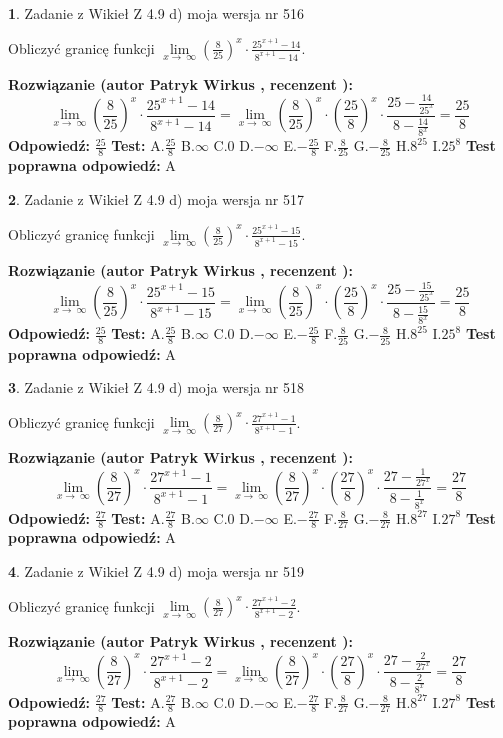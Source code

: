\documentclass[12pt, a4paper]{article}
\theoremstyle{definition} %
\newtheorem{zad}{}
\newcommand{\zadStart}[1]{\begin{zad}#1\newline}
\newcommand{\zadStop}{\end{zad}}
\newcommand{\rozwStart}[2]{\noindent \textbf{Rozwiązanie (autor #1 , recenzent #2): }\newline}
\newcommand{\rozwStop}{\newline}
\newcommand{\odpStart}{\noindent \textbf{Odpowiedź:}\newline}
\newcommand{\odpStop}{\newline}
\newcommand{\testStart}{\noindent \textbf{Test:}\newline}
\newcommand{\testStop}{\newline}
\newcommand{\kluczStart}{\noindent \textbf{Test poprawna odpowiedź:}\newline}
\newcommand{\kluczStop}{\newline}
\begin{document}
\zadStart{Zadanie z Wikieł Z 4.9 d) moja wersja nr 516}


Obliczyć granicę funkcji  $\lim\limits_{x\to\ \infty}(\frac{8}{25})^{x}\cdot\frac{25^{x+1}-14}{8^{x+1}-14}$.
\zadStop
\rozwStart{Patryk Wirkus}{}
$$\lim\limits_{x\to\ \infty}(\frac{8}{25})^{x}\cdot\frac{25^{x+1}-14}{8^{x+1}-14}=\lim\limits_{x\to\ \infty}(\frac{8}{25})^{x}\cdot(\frac{25}{8})^{x} \cdot \frac{25-\frac{14}{25^{x}}}{8-\frac{14}{8^{x}}} = \frac{25}{8}$$
\rozwStop
\odpStart
$\frac{25}{8}$
\odpStop
\testStart
A.$\frac{25}{8}$ B.$\infty$ C.$0$ D.$-\infty$ E.$-\frac{25}{8}$
F.$\frac{8}{25}$ G.$-\frac{8}{25}$
H.$8^{25}$
I.$25^{8}$
\testStop
\kluczStart
A
\kluczStop



\zadStart{Zadanie z Wikieł Z 4.9 d) moja wersja nr 517}


Obliczyć granicę funkcji  $\lim\limits_{x\to\ \infty}(\frac{8}{25})^{x}\cdot\frac{25^{x+1}-15}{8^{x+1}-15}$.
\zadStop
\rozwStart{Patryk Wirkus}{}
$$\lim\limits_{x\to\ \infty}(\frac{8}{25})^{x}\cdot\frac{25^{x+1}-15}{8^{x+1}-15}=\lim\limits_{x\to\ \infty}(\frac{8}{25})^{x}\cdot(\frac{25}{8})^{x} \cdot \frac{25-\frac{15}{25^{x}}}{8-\frac{15}{8^{x}}} = \frac{25}{8}$$
\rozwStop
\odpStart
$\frac{25}{8}$
\odpStop
\testStart
A.$\frac{25}{8}$ B.$\infty$ C.$0$ D.$-\infty$ E.$-\frac{25}{8}$
F.$\frac{8}{25}$ G.$-\frac{8}{25}$
H.$8^{25}$
I.$25^{8}$
\testStop
\kluczStart
A
\kluczStop



\zadStart{Zadanie z Wikieł Z 4.9 d) moja wersja nr 518}


Obliczyć granicę funkcji  $\lim\limits_{x\to\ \infty}(\frac{8}{27})^{x}\cdot\frac{27^{x+1}-1}{8^{x+1}-1}$.
\zadStop
\rozwStart{Patryk Wirkus}{}
$$\lim\limits_{x\to\ \infty}(\frac{8}{27})^{x}\cdot\frac{27^{x+1}-1}{8^{x+1}-1}=\lim\limits_{x\to\ \infty}(\frac{8}{27})^{x}\cdot(\frac{27}{8})^{x} \cdot \frac{27-\frac{1}{27^{x}}}{8-\frac{1}{8^{x}}} = \frac{27}{8}$$
\rozwStop
\odpStart
$\frac{27}{8}$
\odpStop
\testStart
A.$\frac{27}{8}$ B.$\infty$ C.$0$ D.$-\infty$ E.$-\frac{27}{8}$
F.$\frac{8}{27}$ G.$-\frac{8}{27}$
H.$8^{27}$
I.$27^{8}$
\testStop
\kluczStart
A
\kluczStop



\zadStart{Zadanie z Wikieł Z 4.9 d) moja wersja nr 519}


Obliczyć granicę funkcji  $\lim\limits_{x\to\ \infty}(\frac{8}{27})^{x}\cdot\frac{27^{x+1}-2}{8^{x+1}-2}$.
\zadStop
\rozwStart{Patryk Wirkus}{}
$$\lim\limits_{x\to\ \infty}(\frac{8}{27})^{x}\cdot\frac{27^{x+1}-2}{8^{x+1}-2}=\lim\limits_{x\to\ \infty}(\frac{8}{27})^{x}\cdot(\frac{27}{8})^{x} \cdot \frac{27-\frac{2}{27^{x}}}{8-\frac{2}{8^{x}}} = \frac{27}{8}$$
\rozwStop
\odpStart
$\frac{27}{8}$
\odpStop
\testStart
A.$\frac{27}{8}$ B.$\infty$ C.$0$ D.$-\infty$ E.$-\frac{27}{8}$
F.$\frac{8}{27}$ G.$-\frac{8}{27}$
H.$8^{27}$
I.$27^{8}$
\testStop
\kluczStart
A
\kluczStop
\end{document}
